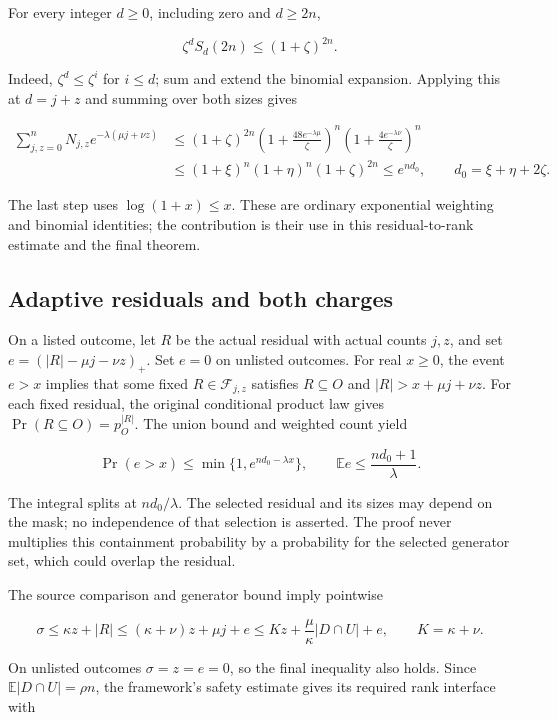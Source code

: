 \documentclass[11pt]{article}
\begin{document}
For every integer \(d\ge0\), including zero and \(d\ge2n\),

\[\zeta^dS_d(2n)\le(1+\zeta)^{2n}.\]

Indeed, \(\zeta^d\le\zeta^i\) for \(i\le d\); sum and extend the binomial expansion. Applying this at \(d=j+z\) and summing over both sizes gives

\[\begin{aligned}
\sum_{j,z=0}^nN_{j,z}e^{-\lambda(\mu j+\nu z)}
&\le(1+\zeta)^{2n}
\left(1+\frac{48e^{-\lambda\mu}}\zeta\right)^n
\left(1+\frac{4e^{-\lambda\nu}}\zeta\right)^n\\
&\le(1+\xi)^n(1+\eta)^n(1+\zeta)^{2n}\le e^{nd_0},
\qquad d_0=\xi+\eta+2\zeta.
\end{aligned}\]

The last step uses \(\log(1+x)\le x\). These are ordinary exponential weighting and binomial identities; the contribution is their use in this residual-to-rank estimate and the final theorem.

\subsection{Adaptive residuals and both charges}\label{adaptive-residuals-and-both-charges}

On a listed outcome, let \(R\) be the actual residual with actual counts \(j,z\), and set \(e=(|R|-\mu j-\nu z)_+\). Set \(e=0\) on unlisted outcomes. For real \(x\ge0\), the event \(e>x\) implies that some fixed \(R\in\mathcal F_{j,z}\) satisfies \(R\subseteq O\) and \(|R|>x+\mu j+\nu z\). For each fixed residual, the original conditional product law gives \(\Pr(R\subseteq O)=p_O^{|R|}\). The union bound and weighted count yield

\[\Pr(e>x)\le\min\{1,e^{nd_0-\lambda x}\},\qquad
\mathbb E e\le\frac{nd_0+1}{\lambda}.\]

The integral splits at \(nd_0/\lambda\). The selected residual and its sizes may depend on the mask; no independence of that selection is asserted. The proof never multiplies this containment probability by a probability for the selected generator set, which could overlap the residual.

The source comparison and generator bound imply pointwise

\[\sigma\le\kappa z+|R|
\le(\kappa+\nu)z+\mu j+e
\le Kz+\frac\mu\kappa|D\cap U|+e,\qquad K=\kappa+\nu.\]

On unlisted outcomes \(\sigma=z=e=0\), so the final inequality also holds. Since \(\mathbb E|D\cap U|=\rho n\), the framework's safety estimate gives its required rank interface with
\end{document}
